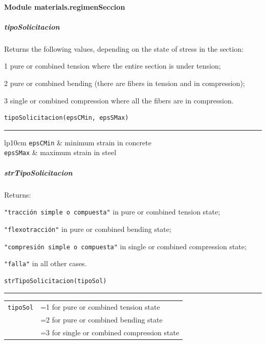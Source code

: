 \paragraph{Module materials.regimenSeccion}
\subparagraph{tipoSolicitacion}
\noindent Returns the following values, depending on the state of stress in the section:
\begin{description}
\item{1} pure or combined tension where the entire section is under tension;
\item{2} pure or combined bending (there are fibers in tension and in compression);
\item{3} single or combined compression where all the fibers are in compression.
\end{description}
\begin{verbatim}
tipoSolicitacion(epsCMin, epsSMax)
\end{verbatim}
\vspace{-10pt}
{\color{grayLines} \rule{\linewidth}{0.25pt}}
\begin{center}
\begin{tabular}{lp{10cm}}
{\tt epsCMin} & minimum strain in concrete \\
{\tt epsSMax} & maximum strain in steel \\
\end{tabular}
\end{center}

\subparagraph{strTipoSolicitacion}
\noindent Returns:
\begin{description}
\item{\verb|"tracción simple o compuesta"|} in pure or combined tension state;
\item{\verb|"flexotracción"|} in pure or combined bending state;
\item{\verb|"compresión simple o compuesta"|} in single or combined compression state;
\item{\verb|"falla"|} in all other cases.
\end{description}
\begin{verbatim}
strTipoSolicitacion(tipoSol)
\end{verbatim}
\vspace{-10pt}
{\color{grayLines} \rule{\linewidth}{0.25pt}}
\begin{center}
\begin{tabular}{lp{10cm}}
{\tt tipoSol} & =1 for pure or combined tension state \\
& =2 for pure or combined bending state \\
& =3 for single or combined compression state \\
\end{tabular}
\end{center}

